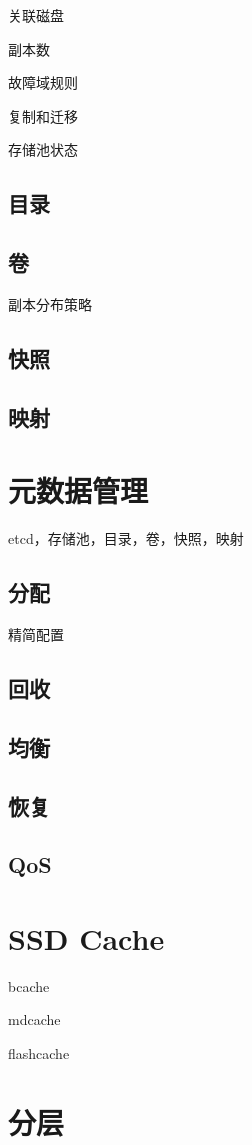 关联磁盘

副本数

故障域规则

复制和迁移

存储池状态

\subsection{目录}

\subsection{卷}

副本分布策略

\subsection{快照}

\subsection{映射}

\section{元数据管理}

etcd，存储池，目录，卷，快照，映射

\subsection{分配}

精简配置

\subsection{回收}

\subsection{均衡}

\subsection{恢复}

\subsection{QoS}

\section{SSD Cache}

bcache

mdcache

flashcache

\section{分层}
